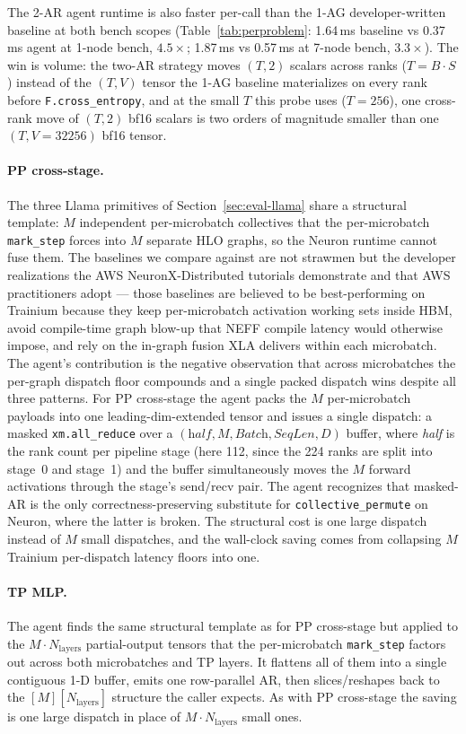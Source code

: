 The 2-AR agent runtime is also faster per-call than the 1-AG
developer-written baseline at both bench scopes
(Table~\ref{tab:perproblem}: 1.64\,ms baseline vs 0.37\,ms agent
at 1-node bench, $4.5\times$; 1.87\,ms vs 0.57\,ms at 7-node
bench, $3.3\times$). The win is volume: the two-AR strategy
moves $(T, 2)$ scalars across ranks ($T = B \cdot S$) instead of
the $(T, V)$ tensor the 1-AG baseline materializes on every rank
before \texttt{F.cross\_entropy}, and at the small $T$ this
probe uses ($T{=}256$), one cross-rank move of $(T, 2)$ bf16
scalars is two orders of magnitude smaller than one
$(T, V{=}32256)$ bf16 tensor.

\paragraph{PP cross-stage.} The three Llama primitives of
Section~\ref{sec:eval-llama} share a structural template: $M$
independent per-microbatch collectives that the per-microbatch
\texttt{mark\_step} forces into $M$ separate HLO graphs, so the
Neuron runtime cannot fuse them. The baselines we compare against
are not strawmen but the developer realizations the AWS
NeuronX-Distributed tutorials demonstrate and that AWS
practitioners adopt --- those baselines are believed to be
best-performing on Trainium because they keep per-microbatch
activation working sets inside HBM, avoid compile-time graph
blow-up that NEFF compile latency would otherwise impose, and
rely on the in-graph fusion XLA delivers within each microbatch.
The agent's contribution is the negative observation that across
microbatches the per-graph dispatch floor compounds and a single
packed dispatch wins despite all three patterns. For PP
cross-stage the agent packs the $M$ per-microbatch payloads into
one leading-dim-extended tensor and issues a single dispatch:
a masked \texttt{xm.all\_reduce} over a
$(\textit{half}, M, \textit{Batch}, \textit{SeqLen}, D)$ buffer,
where \textit{half} is the rank count per pipeline stage
(here 112, since the 224 ranks are split into stage~0 and
stage~1) and the buffer simultaneously moves the $M$ forward
activations through the stage's send/recv pair. The agent
recognizes that masked-AR is the only correctness-preserving
substitute for \texttt{collective\_permute} on Neuron, where
the latter is broken. The structural cost is one large dispatch
instead of $M$ small dispatches, and the wall-clock saving comes
from collapsing $M$ Trainium per-dispatch latency floors into
one.

\paragraph{TP MLP.} The agent finds the same structural template
as for PP cross-stage but applied to the
$M \cdot N_\text{layers}$ partial-output tensors that the
per-microbatch \texttt{mark\_step} factors out across both
microbatches and TP layers. It flattens all of them into a single
contiguous 1-D buffer, emits one row-parallel AR, then
slices/reshapes back to the $[M][N_\text{layers}]$ structure the
caller expects. As with PP cross-stage the saving is one large
dispatch in place of $M \cdot N_\text{layers}$ small ones.


